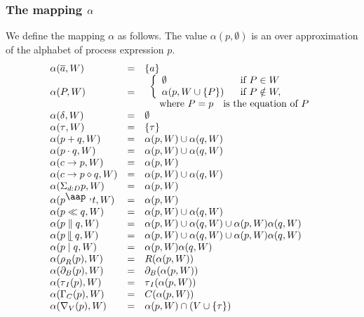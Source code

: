 \documentclass{article}
\begin{document}
\subsubsection{The mapping $\protect\alpha $}

We define the mapping $\alpha $ as follows. The value $\alpha (p,\emptyset )$
is an over approximation of the alphabet of process expression $p$.%
\[
\begin{array}{lll}
\alpha (\overline{a},W) & = & \{a\} \\ 
\alpha (P,W) & = & 
\begin{array}{l}
\left\{ 
\begin{array}{ll}
\emptyset & \text{if }P\in W \\ 
\alpha (p,W\cup \{P\}) & \text{if }P\notin W,%
\end{array}%
\right. \\ 
\text{ where }P=p\text{ is the equation of }P%
\end{array}
\\ 
\alpha (\delta ,W) & = & \emptyset \\ 
\alpha (\tau ,W) & = & \{\tau \} \\ 
\alpha (p+q,W) & = & \alpha (p,W)\cup \alpha (q,W) \\ 
\alpha (p\cdot q,W) & = & \alpha (p,W)\cup \alpha (q,W) \\ 
\alpha (c\rightarrow p,W) & = & \alpha (p,W) \\ 
\alpha (c\rightarrow p\diamond q,W) & = & \alpha (p,W)\cup \alpha (q,W) \\ 
\alpha (\Sigma _{d:D}p,W) & = & \alpha (p,W) \\ 
\alpha (p^{\mathbin{\mbox{\aap
,}}}t,W) & = & \alpha (p,W) \\ 
\alpha (p\ll q,W) & = & \alpha (p,W)\cup \alpha (q,W) \\ 
\alpha (p\parallel q,W) & = & \alpha (p,W)\cup \alpha (q,W)\cup \alpha
(p,W)\alpha (q,W) \\ 
\alpha (p\mathbin{\mathrel{\llfloor}}q,W) & = & \alpha (p,W)\cup \alpha
(q,W)\cup \alpha (p,W)\alpha (q,W) \\ 
\alpha (p\mid q,W) & = & \alpha (p,W)\alpha (q,W) \\ 
\alpha (\rho _{R}(p),W) & = & R(\alpha (p,W)) \\ 
\alpha (\partial _{B}(p),W) & = & \partial _{B}(\alpha (p,W)) \\ 
\alpha (\tau _{I}(p),W) & = & \tau _{I}(\alpha (p,W)) \\ 
\alpha (\Gamma _{C}(p),W) & = & C(\alpha (p,W)) \\ 
\alpha (\nabla _{V}(p),W) & = & \alpha (p,W)\cap (V\cup \{\tau \})%
\end{array}%
\]%
\end{document}
